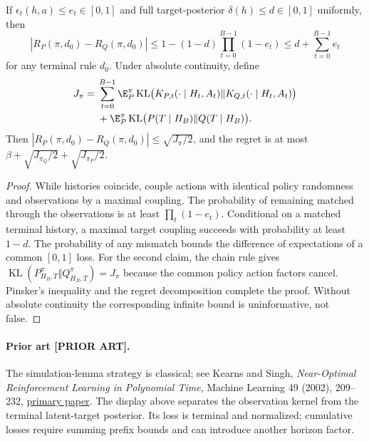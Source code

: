\begin{proposition}
If $\epsilon_t(h,a)\leq e_t\in[0,1]$ and full target-posterior
$\delta(h)\leq d\in[0,1]$ uniformly, then
\begin{equation}
 |R_P(\pi,d_0)-R_Q(\pi,d_0)|
 \leq1-(1-d)\prod_{t=0}^{B-1}(1-e_t)
 \leq d+\sum_{t=0}^{B-1}e_t
 \label{eq:r3-coupling}
\end{equation}
for any terminal rule $d_0$.
Under absolute continuity, define
\begin{align*}
 J_\pi={}&\sum_{t=0}^{B-1}\E_P^\pi
 \operatorname{KL}\bigl(K_{P,t}(\cdot\mid H_t,A_t)
                    \Vert K_{Q,t}(\cdot\mid H_t,A_t)\bigr)\\
 &+\E_P^\pi\operatorname{KL}\bigl(P(T\mid H_B)\Vert Q(T\mid H_B)\bigr).
\end{align*}
Then $|R_P(\pi,d_0)-R_Q(\pi,d_0)|\leq\sqrt{J_\pi/2}$, and the regret
is at most $\beta+\sqrt{J_{\pi_Q}/2}+\sqrt{J_{\pi_P}/2}$.
\end{proposition}
\begin{proof}
While histories coincide, couple actions with identical policy randomness
and observations by a maximal coupling.  The probability of remaining
matched through the observations is at least $\prod_t(1-e_t)$.  Conditional
on a matched terminal history, a maximal target coupling succeeds with
probability at least $1-d$.  The probability of any mismatch bounds the
difference of expectations of a common $[0,1]$ loss.  For the second claim,
the chain rule gives
$\operatorname{KL}(P^\pi_{H_B,T}\Vert Q^\pi_{H_B,T})=J_\pi$ because the
common policy action factors cancel.  Pinsker's inequality and the
regret decomposition complete the proof.  Without absolute continuity
the corresponding infinite bound is uninformative, not false.
\end{proof}

\paragraph{Prior art [PRIOR ART].}
The simulation-lemma strategy is classical; see Kearns and Singh,
\emph{Near-Optimal Reinforcement Learning in Polynomial Time}, Machine
Learning 49 (2002), 209--232,
\href{https://people.eecs.berkeley.edu/~pabbeel/cs287-fa09/readings/KearnsSingh_E3_2002.pdf}{primary paper}.
The display above separates the observation kernel from the terminal
latent-target posterior.  Its loss is terminal and normalized; cumulative
losses require summing prefix bounds and can introduce another horizon
factor.

